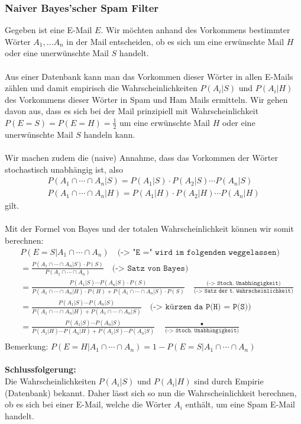 \documentclass[a4paper]{article}
\begin{document}
\subsubsection{Naiver Bayes'scher Spam Filter}
Gegeben ist eine E-Mail $E$.  Wir möchten anhand des Vorkommens bestimmter Wörter $A_1, \ldots A_n$ in der Mail entscheiden, ob es sich um eine erwünschte Mail $H$ oder eine unerwünschte Mail $S$ handelt.\\\\
Aus einer Datenbank kann man das Vorkommen dieser Wörter in allen E-Mails zählen und damit empirisch die Wahrscheinlichkeiten $P(A_i | S)$ und $P(A_i | H) $ des Vorkommens dieser Wörter in Spam und Ham Mails ermitteln.  Wir gehen davon aus, dass es sich bei der Mail  prinzipiell mit  Wahrscheinlichkeit $P(E= S) = P(E= H)= \frac{1}{2}$  um eine erwünschte  Mail $H$ oder eine unerwünschte Mail $S$  handeln kann. \\\\
 Wir machen zudem die (naive) Annahme, dass das Vorkommen der Wörter  stochastisch unabhängig ist, also 
\begin{align*}
P(A_1 \cap \cdots \cap A_n | S) = P(A_1 | S) \cdot P(A_2 | S) \cdots P(A_n | S) \\
P(A_1 \cap \cdots \cap A_n | H) = P(A_1 | H) \cdot P(A_2 | H) \cdots P(A_n | H)
\end{align*}
gilt.\\\\
Mit der Formel von Bayes und der totalen Wahrscheinlichkeit  können wir somit berechnen:
\begin{align*}
& P(E=S |  A_1 \cap \cdots \cap A_n) \quad \texttt{(-> "E =" wird im folgenden weggelassen)}\\[5pt]
&= \frac{P(A_1 \cap \cdots \cap A_n | S) \cdot P(S)}{P(A_1 \cap \cdots \cap A_n)} \quad \texttt{(-> Satz von Bayes)}\\[5pt]
&=  \frac{P(A_1 | S) \cdots P(A_n | S) \cdot P(S)}{P(A_1 \cap \cdots \cap A_n | H) \cdot P(H) + P(A_1 \cap \cdots \cap A_n | S) \cdot P(S)} \quad \frac{\texttt{(-> Stoch. Unabhängigkeit)}}{\texttt{(-> Satz der t. Wahrscheinlichkeit)}} \\[5pt]
&=  \frac{P(A_1 | S) \cdots P(A_n | S)}{P(A_1 \cap \cdots \cap A_n | H) + P(A_1 \cap \cdots \cap A_n | S)} \quad \texttt{(-> kürzen da P(H) = P(S))} \\[5pt]
&=  \frac{P(A_1 | S) \cdots P(A_n | S)}{P(A_1 | H) \cdots P(A_n | H)  + P(A_1 | S) \cdots P(A_n | S) } \quad \frac{•}{\texttt{(-> Stoch. Unabhängigkeit)}} \\
\end{align*}
Bemerkung: $P(E=H |  A_1 \cap \cdots \cap A_n) = 1- P(E=S |  A_1 \cap \cdots \cap A_n) $\\\\
\textbf{Schlussfolgerung:}\\
Die Wahrscheinlichkeiten $P(A_i | S)$ und $P(A_i | H) $ sind durch Empirie (Datenbank) bekannt. Daher lässt sich so nun die Wahrscheinlichkeit berechnen, ob es sich bei einer E-Mail, welche die Wörter $A_i$ enthält, um eine Spam E-Mail handelt.
\end{document}
